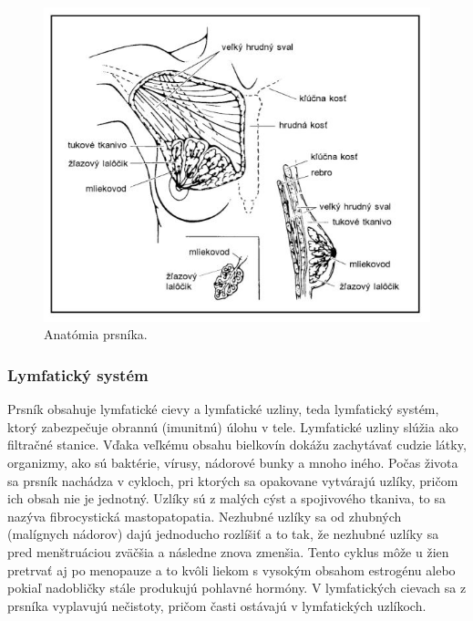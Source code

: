 \begin{figure}[h!]
\begin{centering}
\includegraphics[width=15cm]{assets/images/242_1.JPG}
\par\end{centering}
\caption{Anatómia prsníka. \label{fig:dynabook}\cite{RAKOVINA-PRSNÍKA}}
\end{figure}

\subsubsection{Lymfatický systém }
\hspace{10mm}Prsník obsahuje lymfatické cievy a lymfatické uzliny, teda lymfatický systém, ktorý zabezpečuje obrannú (imunitnú) úlohu v tele. Lymfatické uzliny slúžia ako filtračné stanice. Vďaka veľkému obsahu bielkovín dokážu zachytávať cudzie látky, organizmy,  ako sú baktérie, vírusy, nádorové bunky a mnoho iného. Počas života sa prsník nachádza v cykloch, pri ktorých sa opakovane vytvárajú uzlíky, pričom ich obsah nie je jednotný. Uzlíky sú z malých cýst a spojivového tkaniva, to sa nazýva fibrocystická mastopatopatia. Nezhubné uzlíky sa od zhubných (malígnych nádorov) dajú jednoducho rozlíšiť a to tak, že nezhubné uzlíky sa pred menštruáciou zväčšia a následne znova zmenšia. Tento cyklus môže u žien pretrvať aj po menopauze a to kvôli liekom s vysokým obsahom estrogénu alebo pokiaľ nadobličky stále produkujú pohlavné hormóny. V lymfatických cievach sa  z prsníka vyplavujú nečistoty, pričom časti ostávajú v lymfatických uzlíkoch. 


